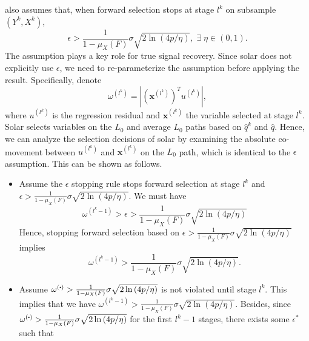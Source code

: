 \documentclass[11pt,review,authoryear]{elsarticle}
\begin{document}
\begin{appendices}
\citet{zhang09} also assumes that, when forward selection stops at stage $l^k$ on subsample $\left(Y^{k},X^{k}\right)$,
%
\begin{displaymath}
  \epsilon>\frac{1}{1-\mu_{X}\left(F\right)}\sigma\sqrt{2\ln\left(4p/\eta\right)},
  \;\exists\; \eta \in \left(0, 1\right).
\end{displaymath}
%
The assumption plays a key role for true signal recovery. Since solar does not explicitly use $\epsilon$, we need to re-parameterize the assumption before applying the \citet{zhang09} result. Specifically, denote
%
\begin{equation}
  \omega^{\left(l^k\right)} = \left\vert \left( \mathbf{x}^{\left( l^k \right)}\right) ^T u^{\left(l^k \right)} \right\vert,
\end{equation}
%
where $u^{\left( l^k \right)}$ is the regression residual and $\mathbf{x}^{ \left( l^k \right)}$ the variable selected at stage $l^k$. Solar selects variables on the $L_0$ and average $L_0$ paths based on $\widehat{q}^k$ and $\widehat{q}$. Hence, we can analyze the selection decisions of solar by examining the absolute co-movement between $u^{\left( l^k \right)}$ and $\mathbf{x}^{ \left( l^k \right)}$ on the $L_0$ path, which is identical to the $\epsilon$ assumption. This can be shown as follows.
%
\begin{itemize}
  \item Assume the $\epsilon$ stopping rule stops forward selection at stage $l^k$ and $\epsilon > \frac{1}{1-\mu_{X}\left(F\right)}\sigma\sqrt{2\ln\left(4p/\eta\right)}$. We must have
  \begin{equation}
    \omega^{\left(l^k - 1\right)} > \epsilon > \frac{1}{1 - \mu_X \left( F \right)} \sigma \sqrt{ 2 \ln \left(4p / \eta \right)}
  \end{equation}
  Hence, stopping forward selection based on $\epsilon > \frac{1}{1 - \mu_X \left( F \right)} \sigma \sqrt{ 2 \ln \left(4p / \eta \right)}$ implies
  \begin{displaymath}
    \omega^{\left(l^k - 1\right)} > \frac{1}{1 - \mu_X \left( F \right)} \sigma \sqrt{ 2 \ln \left(4p / \eta \right)}.
  \end{displaymath}
  \item Assume $\omega^{\left(\bigcdot\right)} > \frac{1}{1 - \mu_X \left( F \right)} \sigma \sqrt{ 2 \ln \left(4p / \eta \right)}$ is not violated until stage $l^k$. This implies that we have $\omega^{\left(l^k - 1 \right)} > \frac{1}{1 - \mu_X \left( F \right)} \sigma \sqrt{ 2 \ln \left(4p / \eta \right)}$. Besides, since $\omega^{\left(\bigcdot\right)} > \frac{1}{1 - \mu_X \left( F \right)} \sigma \sqrt{ 2 \ln \left(4p / \eta \right)}$ for the first $l^k-1$ stages, there exists some $\epsilon^*$ such that 

\end{itemize}
\end{appendices}
\end{document}
